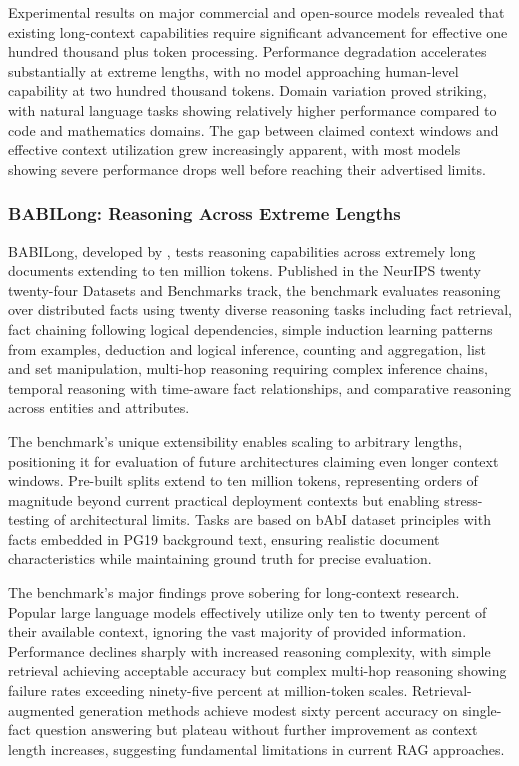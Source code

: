 \documentclass[11pt,letterpaper]{article}
\begin{document}
Experimental results on major commercial and open-source models revealed that existing long-context capabilities require significant advancement for effective one hundred thousand plus token processing. Performance degradation accelerates substantially at extreme lengths, with no model approaching human-level capability at two hundred thousand tokens. Domain variation proved striking, with natural language tasks showing relatively higher performance compared to code and mathematics domains. The gap between claimed context windows and effective context utilization grew increasingly apparent, with most models showing severe performance drops well before reaching their advertised limits.

\subsubsection{BABILong: Reasoning Across Extreme Lengths}

BABILong, developed by \cite{kuratov2024babilong}, tests reasoning capabilities across extremely long documents extending to ten million tokens. Published in the NeurIPS twenty twenty-four Datasets and Benchmarks track, the benchmark evaluates reasoning over distributed facts using twenty diverse reasoning tasks including fact retrieval, fact chaining following logical dependencies, simple induction learning patterns from examples, deduction and logical inference, counting and aggregation, list and set manipulation, multi-hop reasoning requiring complex inference chains, temporal reasoning with time-aware fact relationships, and comparative reasoning across entities and attributes.

The benchmark's unique extensibility enables scaling to arbitrary lengths, positioning it for evaluation of future architectures claiming even longer context windows. Pre-built splits extend to ten million tokens, representing orders of magnitude beyond current practical deployment contexts but enabling stress-testing of architectural limits. Tasks are based on bAbI dataset principles with facts embedded in PG19 background text, ensuring realistic document characteristics while maintaining ground truth for precise evaluation.

The benchmark's major findings prove sobering for long-context research. Popular large language models effectively utilize only ten to twenty percent of their available context, ignoring the vast majority of provided information. Performance declines sharply with increased reasoning complexity, with simple retrieval achieving acceptable accuracy but complex multi-hop reasoning showing failure rates exceeding ninety-five percent at million-token scales. Retrieval-augmented generation methods achieve modest sixty percent accuracy on single-fact question answering but plateau without further improvement as context length increases, suggesting fundamental limitations in current RAG approaches.
\end{document}
